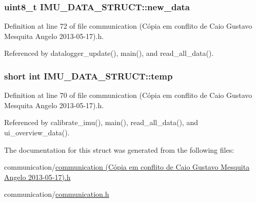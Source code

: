 \hypertarget{structIMU__DATA__STRUCT_a99924252176326418863e511d4fa437b}{
\subsubsection[{new\-\_\-data}]{\setlength{\rightskip}{0pt plus 5cm}uint8\-\_\-t I\-M\-U\-\_\-\-D\-A\-T\-A\-\_\-\-S\-T\-R\-U\-C\-T\-::new\-\_\-data}}\label{structIMU__DATA__STRUCT_a99924252176326418863e511d4fa437b}


Definition at line 72 of file communication (\-Cópia em conflito de Caio Gustavo Mesquita Angelo 2013-\/05-\/17).\-h.



Referenced by datalogger\-\_\-update(), main(), and read\-\_\-all\-\_\-data().

\hypertarget{structIMU__DATA__STRUCT_a81e1dbf765c1d947ca6076aa1bbc73e7}{
\subsubsection[{temp}]{\setlength{\rightskip}{0pt plus 5cm}short int I\-M\-U\-\_\-\-D\-A\-T\-A\-\_\-\-S\-T\-R\-U\-C\-T\-::temp}}\label{structIMU__DATA__STRUCT_a81e1dbf765c1d947ca6076aa1bbc73e7}


Definition at line 70 of file communication (\-Cópia em conflito de Caio Gustavo Mesquita Angelo 2013-\/05-\/17).\-h.



Referenced by calibrate\-\_\-imu(), main(), read\-\_\-all\-\_\-data(), and ui\-\_\-overview\-\_\-data().



The documentation for this struct was generated from the following files\-:\begin{DoxyCompactItemize}
\item 
communication/\hyperlink{communication_01_07C_xC3_xB3pia_01em_01conflito_01de_01Caio_01Gustavo_01Mesquita_01Angelo_012013-05-17_08_8h}{communication (\-Cópia em conflito de Caio Gustavo Mesquita Angelo 2013-\/05-\/17).\-h}\item 
communication/\hyperlink{communication_2communication_8h}{communication.\-h}\end{DoxyCompactItemize}
